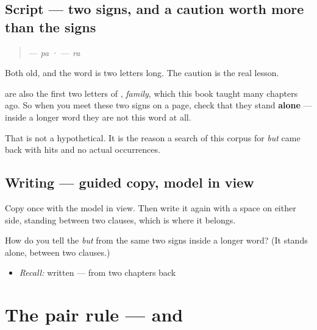 \subsection*{Script — two signs, and a caution worth more than the signs}
\begin{quote}
\textbf{} — \emph{pa} · \textbf{} — \emph{ra}
\end{quote}

Both old, and the word is two letters long. The caution is the real lesson.

\textbf{} are also the first two letters of \textbf{}, \emph{family}, which this book taught many chapters ago. So when you meet these two signs on a page, check that they stand \textbf{alone} — inside a longer word they are not this word at all.

That is not a hypothetical. It is the reason a search of this corpus for \emph{but} came back with hits and no actual occurrences.

\subsection*{Writing — guided copy, model in view}

Copy \textbf{} once with the model in view. Then write it again with a space on either side, standing between two clauses, which is where it belongs.

\begin{tcolorbox}[breakable,colback=teal!4,colframe=teal!35!black,title={Before you move on}]
How do you tell the \emph{but} \textbf{} from the same two signs inside a longer word? (It stands alone, between two clauses.)

\begin{itemize}
\raggedright
  \item \emph{Recall:} \textbf{} written — from two chapters back
\end{itemize}
\end{tcolorbox}
\section[\texorpdfstring{\pa{ਧੰਨਵਾਦ} / \pa{ਸ਼ੁਕਰੀਆ} (dhannavād / shukrīā)}{ਧੰਨਵਾਦ / ਸ਼ੁਕਰੀਆ (dhannavād / shukrīā)}]{The pair rule —  and }

\label{lesson:PA-C39-doublet}




